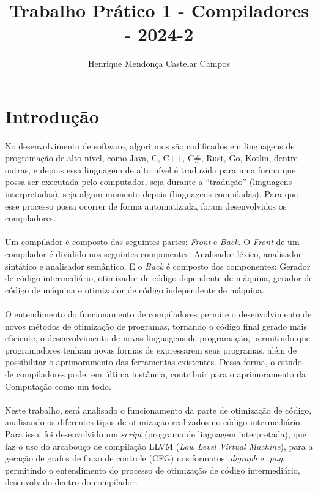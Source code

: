 \documentclass[12pt]{article}
\title{Trabalho Prático 1 - Compiladores - 2024-2}
\author{Henrique Mendonça Castelar Campos}
\begin{document}
\maketitle

\section{Introdução}

\paragraph{}No desenvolvimento de software, algoritmos são codificados em linguagens de programação de alto nível, como Java, C, C++, C\#, Rust, Go, Kotlin, dentre outras, e depois essa linguagem de alto nível é traduzida para uma forma que possa ser executada pelo computador, seja durante a “tradução” (linguagens interpretadas), seja algum momento depois (linguagens compiladas). Para que esse processo possa ocorrer de forma automatizada, foram desenvolvidos os compiladores.

\paragraph{}Um compilador é composto das seguintes partes: \textit{Front} e \textit{Back}. O \textit{Front} de um compilador é dividido nos seguintes componentes: Analisador léxico, analisador sintático e analisador semântico. E o \textit{Back} é composto dos componentes: Gerador de código intermediário, otimizador de código dependente de máquina, gerador de código de máquina e otimizador de código independente de máquina.

\paragraph{}O entendimento do funcionamento de compiladores permite o desenvolvimento de novos métodos de otimização de programas, tornando o código final gerado mais eficiente, o desenvolvimento de novas linguagens de programação, permitindo que programadores tenham novas formas de expressarem seus programas, além de possibilitar o aprimoramento das ferramentas existentes. Dessa forma, o estudo de compiladores pode, em última instância, contribuir para o aprimoramento da Computação como um todo.

\paragraph{}Neste trabalho, será analisado o funcionamento da parte de otimização de código, analisando os diferentes tipos de otimização realizados no código intermediário. Para isso, foi desenvolvido um \textit{script} (programa de linguagem interpretada), que faz o uso do arcabouço de compilação LLVM (\textit{Low Level Virtual Machine}), para a geração de grafos de fluxo de controle (CFG) nos formatos \textit{.digraph} e \textit{.png}, permitindo o entendimento do processo de otimização de código intermediário, desenvolvido dentro do compilador.
\end{document}
